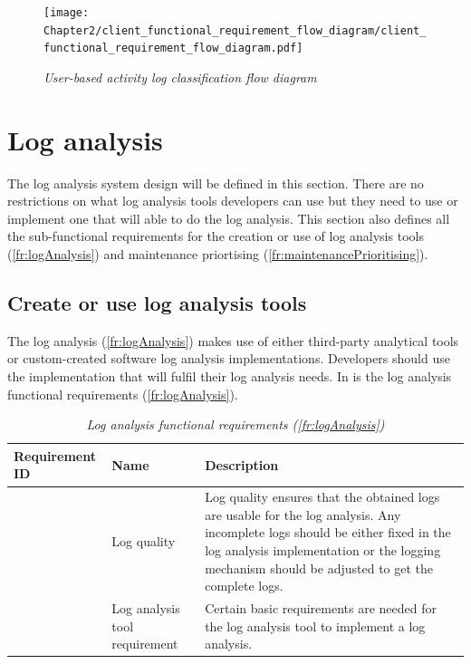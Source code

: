 \begin{figure}[!htb] %
	\centering %
	\texttt{[image: Chapter2/client\_functional\_requirement\_flow\_diagram/client\_functional\_requirement\_flow\_diagram.pdf]}
	\caption[User-based activity log classification flow diagram]
	{\textit{User-based activity log classification flow diagram}}\label{fig:ch2_user_based_actvity_classification}
\end{figure}

\clearpage

\section{Log analysis}\label{ch2:sec_system_utilisation_analysis}
The log analysis system design will be defined in this section. There are no restrictions on what log analysis tools developers can use but they need to use or implement one that will able to do the log analysis. This section also defines all the sub-functional requirements for the creation or use of log analysis tools (\ref{fr:logAnalysis}) and maintenance priortising (\ref{fr:maintenancePrioritising}).

\subsection{Create or use log analysis tools}
The log analysis (\ref{fr:logAnalysis}) makes use of either third-party analytical tools or custom-created software log analysis implementations. Developers should use the implementation that will fulfil their log analysis needs. In  is the log analysis functional requirements (\ref{fr:logAnalysis}).

\setcounter{phase}{3}
\setcounter{subphase}{0}
\begin{table}[!htb]
	\centering
	\caption[Log analysis functional requirements (\ref{fr:logAnalysis})]
	{\textit{Log analysis functional requirements (\ref{fr:logAnalysis})}}
	\label{tbl:ch2_logAnalysis}
	\begin{tabularx}{\textwidth}{|l|l|X|}
		\hline \textbf{Requirement ID} & \textbf{Name} & \textbf{Description} \\
		\hline \subphase{fr:logQuality} & Log quality & \RaggedRight Log quality ensures that the obtained logs are usable for the log analysis. Any incomplete logs should be either fixed in the log analysis implementation or the logging mechanism should be adjusted to get the complete logs. \\
		\hline \subphase{fr:logAnalysisTool} & Log analysis tool requirement & \RaggedRight Certain basic requirements are needed for the log analysis tool to implement a log analysis. \\
		\hline
	\end{tabularx}
\end{table}


